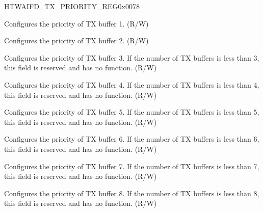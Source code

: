 \begin{register}{H}{TWAIFD\_TX\_PRIORITY\_REG}{0x0078}\label{regdesc:TWAIFDTXPRIORITYREG}
%
%
%
%
%
%
%
%
%
%
%
%
%
%
%
%
\regnewline%
\begin{regdesc}\begin{reglist}
\label{fielddesc:TWAIFDTXT1P}\item [TWAIFD\_TXT1P] Configures the priority of TX buffer 1. (R/W)
\label{fielddesc:TWAIFDTXT2P}\item [TWAIFD\_TXT2P] Configures the priority of TX buffer 2. (R/W)
\label{fielddesc:TWAIFDTXT3P}\item [TWAIFD\_TXT3P] Configures the priority of TX buffer 3. If the number of TX buffers is less than 3, this field is reserved and has no function. (R/W)
\label{fielddesc:TWAIFDTXT4P}\item [TWAIFD\_TXT4P] Configures the priority of TX buffer 4. If the number of TX buffers is less than 4, this field is reserved and has no function. (R/W)
\label{fielddesc:TWAIFDTXT5P}\item [TWAIFD\_TXT5P] Configures the priority of TX buffer 5. If the number of TX buffers is less than 5, this field is reserved and has no function. (R/W)
\label{fielddesc:TWAIFDTXT6P}\item [TWAIFD\_TXT6P] Configures the priority of TX buffer 6. If the number of TX buffers is less than 6, this field is reserved and has no function. (R/W)
\label{fielddesc:TWAIFDTXT7P}\item [TWAIFD\_TXT7P] Configures the priority of TX buffer 7. If the number of TX buffers is less than 7, this field is reserved and has no function. (R/W)
\label{fielddesc:TWAIFDTXT8P}\item [TWAIFD\_TXT8P] Configures the priority of TX buffer 8. If the number of TX buffers is less than 8, this field is reserved and has no function. (R/W)
\end{reglist}\end{regdesc}
\end{register}


